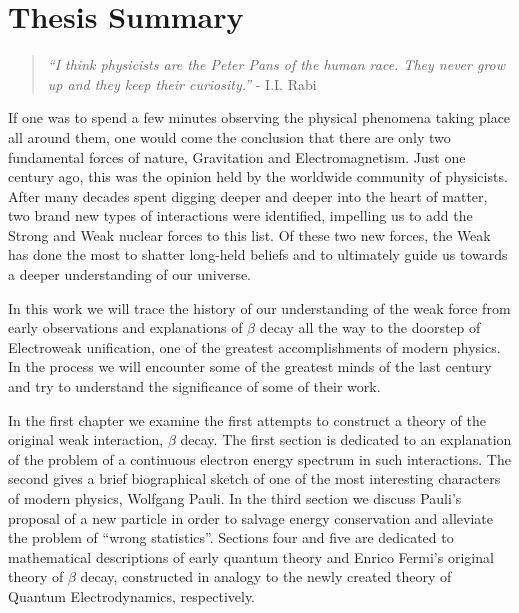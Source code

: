 \documentclass[12pt]{book}
\begin{document}

\chapter*{Thesis Summary}



\begin{quotation}
 \textit{“I think physicists are the Peter Pans of the human race. They never grow up and they keep their curiosity.”} - I.I. Rabi
\end{quotation}

\noindent If one was to spend a few minutes observing the physical phenomena taking place all around them, one would come the conclusion that there are only two fundamental forces of nature, Gravitation and Electromagnetism. Just one century ago, this was the opinion held by the worldwide community of physicists. After many decades spent digging deeper and deeper into the heart of matter, two brand new types of interactions were identified, impelling us to add the Strong and Weak nuclear forces to this list. Of these two new forces, the Weak has done the most to shatter long-held beliefs and to ultimately guide us towards a deeper understanding of our universe. 

In this work we will trace the history of our understanding of the weak force from early observations and explanations of $\beta$ decay all the way to the doorstep of Electroweak unification, one of the greatest accomplishments of modern physics. In the process we will encounter some of the greatest minds of the last century and try to understand the significance of some of their work.

In the first chapter we examine the first attempts to construct a theory of the original weak interaction, $\beta$ decay. The first section is dedicated to an explanation of the problem of a continuous electron energy spectrum in such interactions. The second gives a brief biographical sketch of one of the most interesting characters of modern physics, Wolfgang Pauli. In the third section we discuss Pauli's proposal of a new particle in order to salvage energy conservation and alleviate the problem of ``wrong statistics''. Sections four and five are dedicated to mathematical descriptions of early quantum theory and Enrico Fermi's original theory of $\beta$ decay, constructed in analogy to the newly created theory of Quantum Electrodynamics, respectively.
\end{document}
